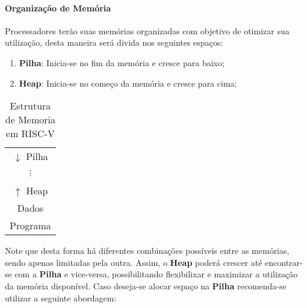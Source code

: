 \documentclass{article}
\begin{document}
            \paragraph{Organização de Memória}Processadores terão suas memórias organizadas com objetivo de otimizar sua utilização, desta maneira será divida nos seguintes espaços:
                \begin{enumerate}[rightmargin = \leftmargin, noitemsep]
                    \item \textbf{Pilha}: Inicia-se no fim da memória e cresce para baixo;
                    \item \textbf{Heap}: Inicia-se no começo da memória e cresce para cima;
                \end{enumerate}
                \begin{table}[H]
                    \centering
                    \begin{tabular}[]{|c|}\hline
                        $\downarrow$ Pilha\\
                        \\
                        $\vdots$\\
                        \\
                        $\uparrow$ Heap\\
                        Dados\\
                        Programa\\\hline
                    \end{tabular}
                    \caption{Estrutura de Memoria em RISC-V}
                \end{table}\noindent
            Note que desta forma há diferentes combinações possíveis entre as memórias, sendo apenas limitadas pela outra. Assim, o \textbf{Heap} poderá crescer até encontrar-se com a \textbf{Pilha} e vice-versa, possibilitando flexibilixar e maximizar a utilização da memória disponível. Caso deseja-se alocar espaço na \textbf{Pilha} recomenda-se utilizar a seguinte abordagem:
\end{document}
